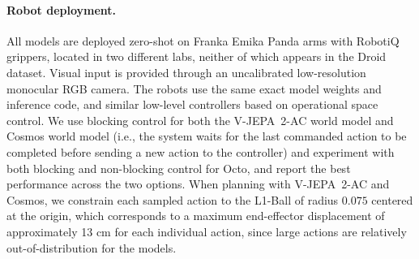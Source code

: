 \documentclass[]{fairmeta}
\newcommand{\acModel}{V-JEPA~2-AC\xspace}
\begin{document}
\paragraph{\bf Robot deployment.}
All models are deployed zero-shot on Franka Emika Panda arms with RobotiQ grippers, located in two different labs, neither of which appears in the Droid dataset.
Visual input is provided through an uncalibrated low-resolution monocular RGB camera.
The robots use the same exact model weights and inference code, and similar low-level controllers based on operational space control.
We use blocking control for both the \acModel world model and Cosmos world model (i.e., the system waits for the last commanded action to be completed before sending a new action to the controller) and experiment with both blocking and non-blocking control for Octo, and report the best performance across the two options.
When planning with \acModel and Cosmos, we constrain each sampled action to the L1-Ball of radius $0.075$ centered at the origin, which corresponds to a maximum end-effector displacement of approximately 13 cm for each individual action, since large actions are relatively out-of-distribution for the models.
\end{document}
